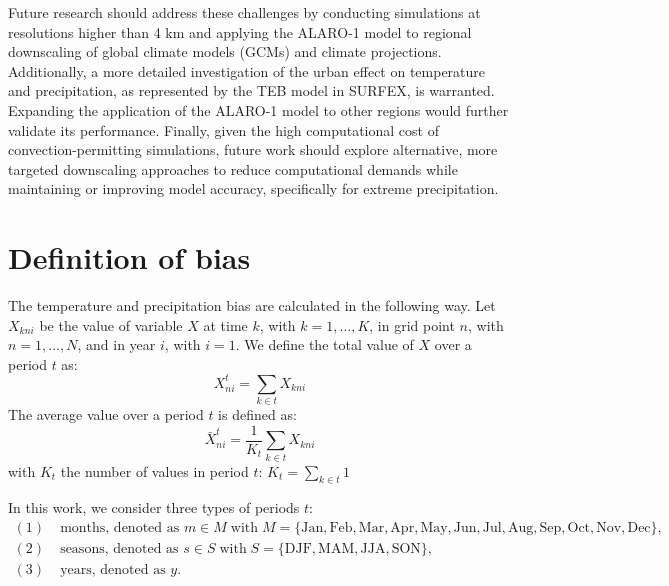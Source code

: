 \documentclass[journal abbreviation, manuscript]{copernicus}
\providecommand{\DIFadd}[1]{{\protect\color{blue}\uwave{#1}}} %
\providecommand{\DIFdel}[1]{{\protect\color{red}\sout{#1}}} %
\providecommand{\DIFaddbegin}{} %
\providecommand{\DIFaddend}{} %
\providecommand{\DIFdelbegin}{} %
\providecommand{\DIFdelend}{} %
\begin{document}
Future research should address these challenges by conducting simulations at resolutions higher than 4 km and applying the ALARO-1 model to regional downscaling of global climate models (GCMs) and climate projections.
Additionally, a more detailed investigation of the urban effect on temperature and precipitation, as represented by the TEB model in SURFEX, is warranted.
Expanding the application of the ALARO-1 model to other regions would further validate its performance.
Finally, given the high computational cost of convection-permitting simulations, future work should explore alternative, more targeted downscaling approaches to reduce computational demands while maintaining or improving model accuracy, specifically for extreme precipitation.

\appendix

\section{Definition of bias}
\label{sect:bias_definition}

The temperature and precipitation bias are calculated in the following way. Let $X_{kni}$ be the value of variable $X$ at time $k$, with $k = 1, \ldots, K$, in grid point $n$, with $n = 1, \ldots, N$, and in year $i$, with \DIFdelbegin \DIFdel{$i = 1$}\DIFdelend \DIFaddbegin \DIFadd{$i = 1, \ldots, I$}\DIFaddend . We define the total value of $X$ over a period $t$ as:
\begin{equation*}
    X^t_{ni} = \sum_{k \in t} X_{kni}
\end{equation*}
The average value over a period $t$ is defined as:
\begin{equation*}
    \bar{X}^t_{ni} = \frac{1}{K_t} \sum_{k \in t} X_{kni}
\end{equation*}
with $K_t$ the number of values in period $t$: $K_t = \sum_{k \in t} 1$

In this work, we consider three types of periods $t$:
\[
\begin{aligned}
(1)\;& \text{months, denoted as } m \in M \; \text{with} \; M = \{\text{Jan}, \text{Feb}, \text{Mar}, \text{Apr}, \text{May}, \text{Jun}, \text{Jul}, \text{Aug}, \text{Sep}, \text{Oct}, \text{Nov}, \text{Dec}\},\\
(2)\;& \text{seasons, denoted as } s \in S \; \text{with} \; S = \{\text{DJF}, \text{MAM}, \text{JJA}, \text{SON}\},\\
(3)\;& \text{years, denoted as } y .
\end{aligned}
\]
\end{document}
